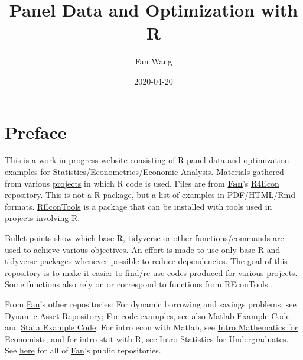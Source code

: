 \documentclass[
]{book}
\title{Panel Data and Optimization with R}
\author{Fan Wang}
\date{2020-04-20}
\begin{document}
\maketitle

{
\hypersetup{linkcolor=}
\setcounter{tocdepth}{1}
\tableofcontents
}
\hypertarget{preface}{%
\chapter*{Preface}\label{preface}}

This is a work-in-progress \href{https://fanwangecon.github.io/R4Econ/}{website} consisting of R panel data and optimization examples for Statistics/Econometrics/Economic Analysis. Materials gathered from various \href{https://fanwangecon.github.io/research}{projects} in which R code is used. Files are from \href{https://fanwangecon.github.io/}{\textbf{Fan}}'s \href{https://github.com/FanWangEcon/R4Econ}{R4Econ} repository. This is not a R package, but a list of examples in PDF/HTML/Rmd formats. \href{https://fanwangecon.github.io/REconTools/}{REconTools} is a package that can be installed with tools used in \href{https://fanwangecon.github.io/research}{projects} involving R.

Bullet points show which \href{https://www.rdocumentation.org/packages/base/versions/3.5.2}{base R}, \href{https://www.tidyverse.org/}{tidyverse} or other functions/commands are used to achieve various objectives. An effort is made to use only \href{https://www.rdocumentation.org/packages/base/versions/3.5.2}{base R} \citep{R-base} and \href{https://www.tidyverse.org/}{tidyverse} \citep{R-tidyverse} packages whenever possible to reduce dependencies. The goal of this repository is to make it easier to find/re-use codes produced for various projects. Some functions also rely on or correspond to functions from \href{https://fanwangecon.github.io/REconTools/}{REconTools} \citep{R-REconTools}.

From \href{https://fanwangecon.github.io/}{Fan}'s other repositories: For dynamic borrowing and savings problems, see \href{https://fanwangecon.github.io/CodeDynaAsset/}{Dynamic Asset Repository}; For code examples, see also \href{https://fanwangecon.github.io/M4Econ/}{Matlab Example Code} and \href{https://fanwangecon.github.io/Stata4Econ/}{Stata Example Code}; For intro econ with Matlab, see \href{https://fanwangecon.github.io/Math4Econ/}{Intro Mathematics for Economists}, and for intro stat with R, see \href{https://fanwangecon.github.io/Stat4Econ/}{Intro Statistics for Undergraduates}. See \href{https://github.com/FanWangEcon}{here} for all of \href{https://fanwangecon.github.io/}{Fan}'s public repositories.
\end{document}
